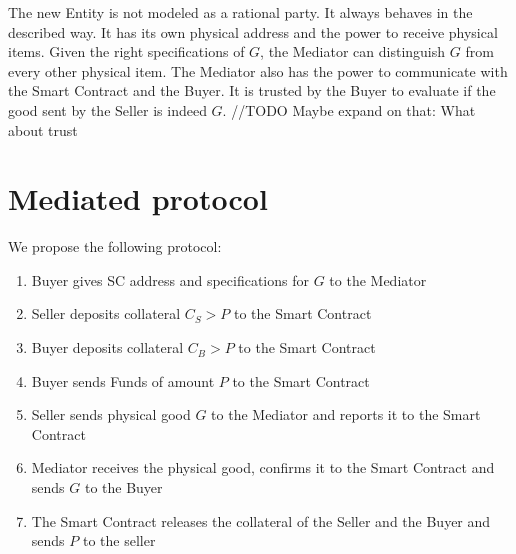 \documentclass{cacthesis}
\begin{document}
The new Entity is not modeled as a rational party. It always behaves in the described way. It has its own physical address and the power to receive physical items. Given the right specifications of $G$, the Mediator can distinguish $G$ from every other  physical item. The Mediator also has the power to communicate with the Smart Contract and the Buyer. It is trusted by the Buyer to evaluate if the good sent by the Seller is indeed $G$.
//TODO Maybe expand on that: What about trust
\section{Mediated protocol}
We propose the following protocol:
\begin{enumerate}
    \item Buyer gives SC address and specifications for $G$ to the Mediator
    \item Seller deposits collateral $C_S > P$ to the Smart Contract
    \item Buyer deposits collateral $C_B > P$ to the Smart Contract
    \item Buyer sends Funds of amount $P$ to the Smart Contract
    \item Seller sends physical good $G$ to the Mediator and reports it to the Smart Contract
    \item Mediator receives the physical good, confirms it to the Smart Contract and sends $G$ to the Buyer
    \item The Smart Contract releases the collateral of the Seller and the Buyer and sends $P$ to the seller
\end{enumerate}
\end{document}
